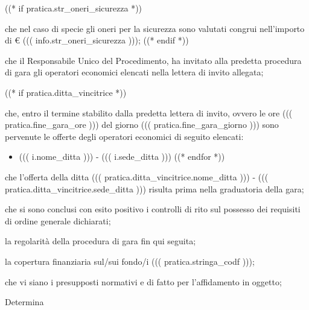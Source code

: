 \documentclass[a4paper,12pt]{letter}
\begin{document}
\begin{list}{RISCONTRATA}{}
((* if pratica.str_oneri_sicurezza *))
\item[RILEVATO] che nel caso di specie gli oneri per la sicurezza sono valutati congrui
                nell'importo di € ((( info.str_oneri_sicurezza )));
((* endif *))
\item[CONSIDERATO] che il Responsabile Unico del Procedimento, ha invitato alla predetta
                   procedura di gara gli operatori economici elencati nella lettera di invito allegata;

((* if pratica.ditta_vincitrice *))
\item[CONSIDERATO] che, entro il termine stabilito dalla predetta lettera di invito,
                   ovvero le ore ((( pratica.fine_gara_ore ))) del giorno
                   ((( pratica.fine_gara_giorno ))) sono pervenute le offerte degli
                   operatori economici di seguito elencati:
\begin{itemize}
((* for i in pratica.lista_ditte *))
    \item ((( i.nome_ditta ))) - ((( i.sede_ditta )))
((* endfor *))
\end{itemize}

\item[RILEVATO] che l'offerta della ditta ((( pratica.ditta_vincitrice.nome_ditta ))) - ((( pratica.ditta_vincitrice.sede_ditta ))) risulta
                prima nella graduatoria della gara;
\item[CONSTATATO] che si sono conclusi con esito positivo i controlli di rito sul 
                  possesso dei requisiti di ordine generale dichiarati;
\item[RISCONTRATA]  la regolarità della procedura di gara fin qui seguita;
\item[CONFERMATA]  la copertura finanziaria sul/sui fondo/i ((( pratica.stringa_codf )));
\item[RITENUTO]  che vi siano i presupposti normativi e di fatto per l'affidamento in oggetto;
\end{list}

\begin{center}
Determina
\end{center}
\end{document}
